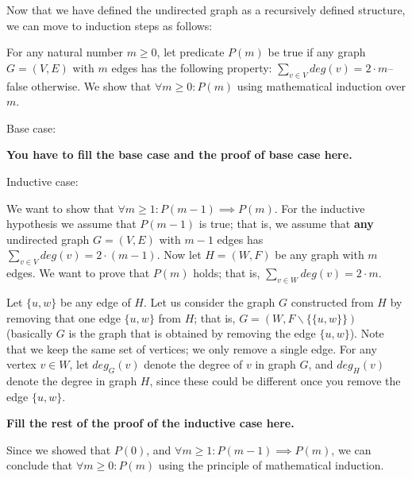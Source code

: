 \documentclass[12pt]{exam}
\begin{document}
Now that we have defined the undirected graph as a recursively defined structure, we can move to induction steps as follows:

For any natural number $m \geq 0$, let predicate $P(m)$ be true if any graph $G=(V,E)$ with $m$ edges has the following property: $\sum_{v \in V} deg(v) = 2\cdot m$-- false otherwise. We show that $\forall m \geq 0: P(m)$ using mathematical induction over $m$.

Base case: 

\textbf{You have to fill the base case and the proof of base case here.}

Inductive case:

We want to show that $\forall m \geq 1: P(m-1) \implies P(m)$. For the inductive hypothesis we assume that $P(m-1)$ is true; that is, we assume that \textbf{any} undirected graph $G=(V,E)$ with $m-1$ edges has $\sum_{v \in V} deg(v) = 2\cdot (m-1)$. Now let $H=(W, F)$ be any graph with $m$ edges. We want to prove that $P(m)$ holds; that is, $\sum_{v \in W} deg(v) = 2\cdot m$.

Let $\{u, w\}$ be any edge of $H$. Let us consider the graph $G$ constructed from $H$ by removing that one edge $\{u, w\}$ from $H$; that is, $G=(W, F \backslash \{\{u, w\}\})$ (basically $G$ is the graph that is obtained by removing the edge $\{u, w\}$). Note that we keep the same set of vertices; we only remove a single edge. For any vertex $v\in W$, let $deg_G(v)$ denote the degree of $v$ in graph $G$, and $deg_H(v)$ denote the degree in graph $H$, since these could be different once you remove the edge $\{u,w\}$.

\textbf{Fill the rest of the proof of the inductive case here.}

Since we showed that $P(0)$, and $\forall m \geq 1: P(m-1) \implies P(m)$, we can conclude that $\forall m \geq 0: P(m)$ using the principle of mathematical induction.
\end{document}
